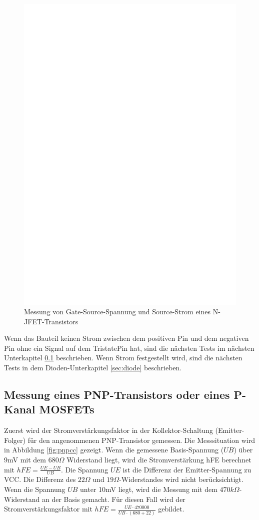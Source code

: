 \begin{figure}[H]
\centering
\includegraphics[]{../FIG/JFETcd.eps}
\caption{Messung von Gate-Source-Spannung und Source-Strom eines N-JFET-Transistors}
\label{fig:JFETcd}
\end{figure}

Wenn das Bauteil keinen Strom zwischen dem positiven Pin und dem negativen Pin ohne ein Signal
auf dem TristatePin hat, sind die nächsten Tests im nächsten Unterkapitel \ref{sec:pnp} beschrieben.
Wenn Strom festgestellt wird, sind die nächsten Tests in dem Dioden-Unterkapitel \ref{sec:diode} beschrieben.

\subsection{Messung eines PNP-Transistors oder eines P-Kanal MOSFETs}
\label{sec:pnp}
Zuerst wird der Stromverstärkungsfaktor in der Kollektor-Schaltung (Emitter-Folger) für den angenommenen
PNP-Transistor gemessen.
Die Messsituation wird in Abbildung \ref{fig:pnpcc} gezeigt.
Wenn die gemessene Basis-Spannung (\(UB\)) über 9mV mit dem \(680\Omega\) Widerstand liegt,
wird die Stromverstärkung hFE berechnet mit \(hFE = \frac{UE-UB}{UB}\). 
Die Spannung \(UE\) ist die Differenz der Emitter-Spannung zu VCC.
Die Differenz des \(22\Omega\) und \(19\Omega\)-Widerstandes wird nicht berücksichtigt.
Wenn die Spannung \(UB\) unter 10mV liegt, wird die Messung mit dem \(470k\Omega\)-Widerstand an der Basis gemacht.
Für diesen Fall wird der Stromverstärkungsfaktor mit \(hFE = \frac{UE \cdot 470000}{UB \cdot (680+22)}\) gebildet.

